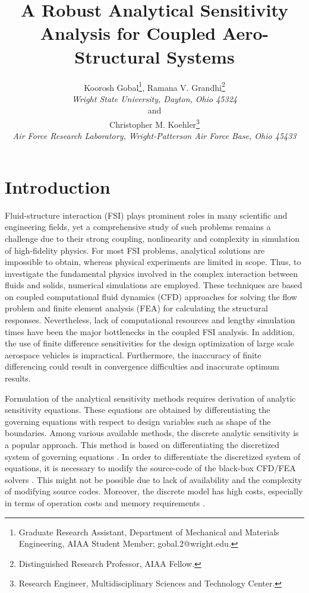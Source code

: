 \documentclass[12pt]{aiaa-pretty}
\author[Gobal, Kohler, and Grandhi]{ %
Koorosh Gobal\thanks{Graduate Research Assistant, Department of Mechanical and Materials Engineering, AIAA Student Member; gobal.2@wright.edu.},
Ramana V. Grandhi\thanks{Distinguished Research Professor, AIAA Fellow.}\\
\textit{Wright State University, Dayton, Ohio 45324}
\\
and 
\\
Christopher M. Koehler\thanks{Research Engineer, Multidisciplinary Sciences and Technology Center.}\\
\textit{Air Force Research Laboratory, Wright-Patterson Air Force Base, Ohio 45433}}
\title{A Robust Analytical Sensitivity Analysis for Coupled Aero-Structural Systems}
\begin{document}
\maketitle
\section{Introduction}
Fluid-structure interaction (FSI) plays prominent roles in many scientific and engineering fields, yet a comprehensive study of such problems remains a challenge due to their strong coupling, nonlinearity and complexity in simulation of high-fidelity physics. For most FSI problems, analytical solutions are impossible to obtain, whereas physical experiments are limited in scope. Thus, to investigate the fundamental physics involved in the complex interaction between fluids and solids, numerical simulations are employed. These techniques are based on coupled computational fluid dynamics (CFD) approaches for solving the flow problem and finite element analysis (FEA) for calculating the structural responses. Nevertheless, lack of computational resources and lengthy simulation times have been the major bottlenecks in the coupled FSI analysis. In addition, the use of finite difference sensitivities for the design optimization of large scale aerospace vehicles is impractical. Furthermore, the inaccuracy of finite differencing could result in convergence difficulties and inaccurate optimum results.

Formulation of the analytical sensitivity methods requires derivation of analytic sensitivity equations. These equations are obtained by differentiating the governing equations with respect to design variables such as shape of the boundaries. Among various available methods, the discrete analytic sensitivity is a popular approach. This method is based on differentiating the discretized system of governing equations \cite{martins2013review}. In order to differentiate the discretized system of equations, it is necessary to modify the source-code of the black-box CFD/FEA solvers \cite{cross2014local}. This might not be possible due to lack of availability and the complexity of modifying source codes. Moreover, the discrete model has high costs, especially in terms of operation costs and memory requirements \cite{peter2010numerical}.
\end{document}
